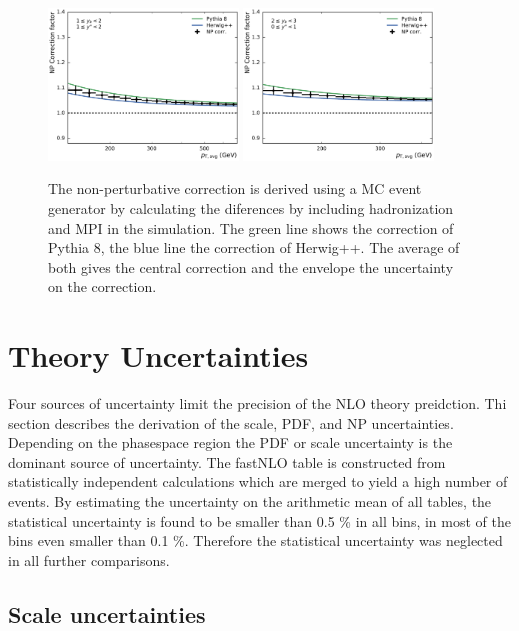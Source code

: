 \begin{figure}[htp]
    \includegraphics[width=0.45\textwidth]{figures/theory/np_factors_calc_yb1ys1.pdf}\hfill
    \includegraphics[width=0.45\textwidth]{figures/theory/np_factors_calc_yb2ys0.pdf}
    \caption{The non-perturbative correction is derived using a MC event
    generator by calculating the diferences by including hadronization and MPI
    in the simulation. The green line shows the correction of Pythia 8, the blue
    line the correction of Herwig++. The average of both gives the central
correction and the envelope the uncertainty on the correction.}
    \label{fig:np_factors}
\end{figure}


\section{Theory Uncertainties}

Four sources of uncertainty limit the precision of the NLO theory preidction.
Thi section describes the derivation of the scale, PDF, \as and NP
uncertainties. Depending on the phasespace region the PDF or scale uncertainty
is the dominant source of uncertainty. The fastNLO table is
constructed from statistically independent calculations which are merged to
yield a high number of events. By estimating the uncertainty on the arithmetic
mean of all tables, the statistical uncertainty is found to be smaller than 0.5
\% in all bins, in most of the bins even smaller than 0.1 \%. Therefore the
statistical uncertainty was neglected in all further comparisons.

\subsection{Scale uncertainties}

